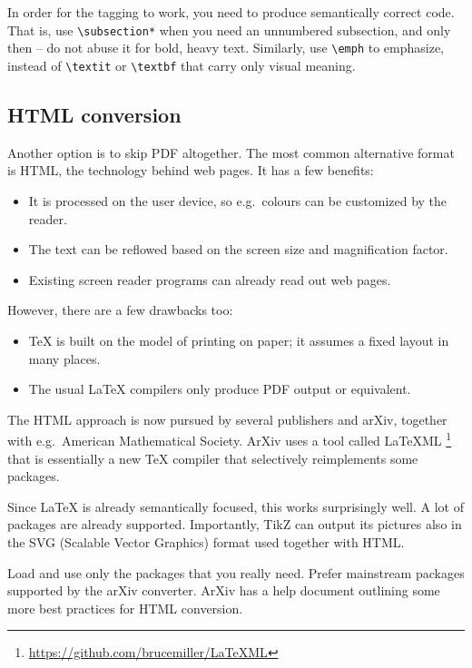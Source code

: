 In order for the tagging to work,
you need to produce semantically correct code.
That is, use \verb|\subsection*| when you need an unnumbered subsection,
and only then -- do not abuse it for bold, heavy text.
Similarly, use \verb|\emph| to emphasize,
instead of \verb|\textit| or \verb|\textbf| that carry only visual meaning.


%
%
\subsection{HTML conversion}

Another option is to skip PDF altogether.
The most common alternative format is HTML, the technology behind web pages.
It has a few benefits:
%
\begin{itemize}
\item It is processed on the user device, so e.g.\ colours can be customized by the reader.
\item The text can be reflowed based on the screen size and magnification factor.
\item Existing screen reader programs can already read out web pages.
\end{itemize}
%
However, there are a few drawbacks too:
%
\begin{itemize}
\item \TeX{} is built on the model of printing on paper; it assumes a fixed layout in many places.
\item The usual \LaTeX{} compilers only produce PDF output or equivalent.
\end{itemize}

The HTML approach is now pursued by several publishers and arXiv,
together with e.g.\ American Mathematical Society.
ArXiv uses a tool called \mbox{LaTeXML}%
\footnote{\url{https://github.com/brucemiller/LaTeXML}}
that is essentially a new \TeX{} compiler that selectively reimplements some packages.

Since \LaTeX{} is already semantically focused, this works surprisingly well.
A lot of packages are already supported.
Importantly, TikZ can output its pictures also in the SVG (Scalable Vector Graphics) format
used together with HTML.

\begin{practices}
Load and use only the packages that you really need.
Prefer mainstream packages supported by the arXiv converter.
ArXiv has a help document outlining some more best practices for HTML conversion.\footnotemark
\end{practices}



